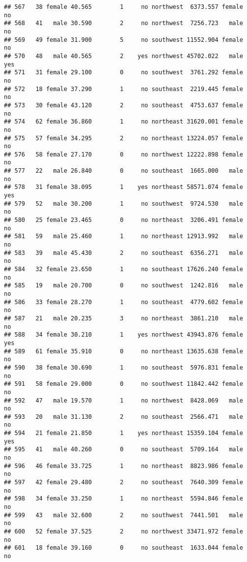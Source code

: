 \documentclass[
]{article}
\begin{document}
\begin{verbatim}
## 567   38 female 40.565        1     no northwest  6373.557 female       no
## 568   41   male 30.590        2     no northwest  7256.723   male       no
## 569   49 female 31.900        5     no southwest 11552.904 female       no
## 570   48   male 40.565        2    yes northwest 45702.022   male      yes
## 571   31 female 29.100        0     no southwest  3761.292 female       no
## 572   18 female 37.290        1     no southeast  2219.445 female       no
## 573   30 female 43.120        2     no southeast  4753.637 female       no
## 574   62 female 36.860        1     no northeast 31620.001 female       no
## 575   57 female 34.295        2     no northeast 13224.057 female       no
## 576   58 female 27.170        0     no northwest 12222.898 female       no
## 577   22   male 26.840        0     no southeast  1665.000   male       no
## 578   31 female 38.095        1    yes northeast 58571.074 female      yes
## 579   52   male 30.200        1     no southwest  9724.530   male       no
## 580   25 female 23.465        0     no northeast  3206.491 female       no
## 581   59   male 25.460        1     no northeast 12913.992   male       no
## 583   39   male 45.430        2     no southeast  6356.271   male       no
## 584   32 female 23.650        1     no southeast 17626.240 female       no
## 585   19   male 20.700        0     no southwest  1242.816   male       no
## 586   33 female 28.270        1     no southeast  4779.602 female       no
## 587   21   male 20.235        3     no northeast  3861.210   male       no
## 588   34 female 30.210        1    yes northwest 43943.876 female      yes
## 589   61 female 35.910        0     no northeast 13635.638 female       no
## 590   38 female 30.690        1     no southeast  5976.831 female       no
## 591   58 female 29.000        0     no southwest 11842.442 female       no
## 592   47   male 19.570        1     no northwest  8428.069   male       no
## 593   20   male 31.130        2     no southeast  2566.471   male       no
## 594   21 female 21.850        1    yes northeast 15359.104 female      yes
## 595   41   male 40.260        0     no southeast  5709.164   male       no
## 596   46 female 33.725        1     no northeast  8823.986 female       no
## 597   42 female 29.480        2     no southeast  7640.309 female       no
## 598   34 female 33.250        1     no northeast  5594.846 female       no
## 599   43   male 32.600        2     no southwest  7441.501   male       no
## 600   52 female 37.525        2     no northwest 33471.972 female       no
## 601   18 female 39.160        0     no southeast  1633.044 female       no

\end{verbatim}
\end{document}
